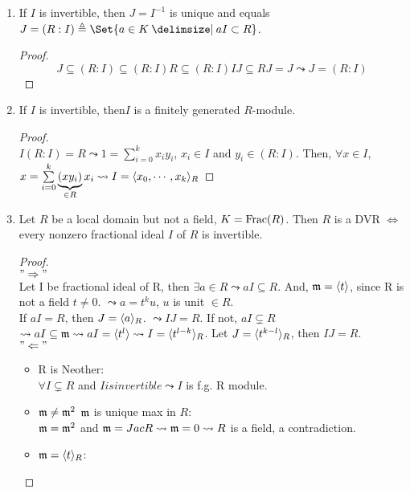 \begin{prop}\mbox{}
  \begin{enumerate}
    \item If $I$ is invertible, then $J = I^{-1}$ is unique and equals
      $J = (R:I) \triangleq \Set{a \in K \given aI \subset R}$.
      \begin{proof}
        $$
          J \subseteq (R:I) \subseteq (R:I)R \subseteq (R:I)IJ \subseteq 
          RJ = J \leadsto J = (R:I)
        $$
      \end{proof}
    \item If $I$ is invertible, then$I$ is a finitely generated $R$-module.
      \begin{proof} $ $\\
        $I(R:I) = R \leadsto 1 = \sum\limits_{i = 0}^{k} x_iy_i$, $x_i \in I$ and
        $y_i \in (R:I)$. Then, $\forall x \in I$, $x = \sum\limits_{i = 0}^{k} 
        \underbrace{(xy_i)}_{\in R}x_i \leadsto I = \langle x_0, \cdots, x_k\rangle_R$
      \end{proof}
    \item Let $R$ be a local domain but not a field, $K = \operatorname{Frac}(R)$.
      Then $R$ is a DVR $\iff$ every nonzero fractional ideal $I$ of $R$ is
      invertible.
      \begin{proof} $ $\\
        $"\Rightarrow"$ \\
        Let I be fractional ideal of R, then $\exists a \in R \leadsto aI 
        \subseteq R$. And, $\mathfrak{m} = \langle t\rangle$, since R is not a field $t \ne 0$.
        $\leadsto a = t^k u$, $u$ is unit $\in R$. \\
        If $aI = R$, then $J = \langle a\rangle_R$. $\leadsto IJ = R$. If not,
        $aI \subsetneq R$ $\leadsto aI \subseteq \mathfrak{m} \leadsto aI = \langle t^l\rangle
        \leadsto I = \langle t^{l - k}\rangle_R$. Let $J = \langle t^{k - l}\rangle_R$, then $IJ
         = R$. \\
        $"\Leftarrow"$ \\
        \begin{itemize}
          \item R is Neother:\\
            $\forall I \subsetneq R$ and $I is invertible \leadsto I$ is f.g.
            R module.
          \item $\mathfrak{m} \neq \mathfrak{m}^2$ $\mathfrak{m}$ is unique max in $R$: \\
            $\mathfrak{m} = \mathfrak{m}^2$ and $\mathfrak{m} = Jac R \leadsto \mathfrak{m} = 0 \leadsto R$ is a field,
             a contradiction.
          \item $\mathfrak{m} = \langle t\rangle_R$: \\

\end{itemize}
\end{proof}
\end{enumerate}
\end{prop}
